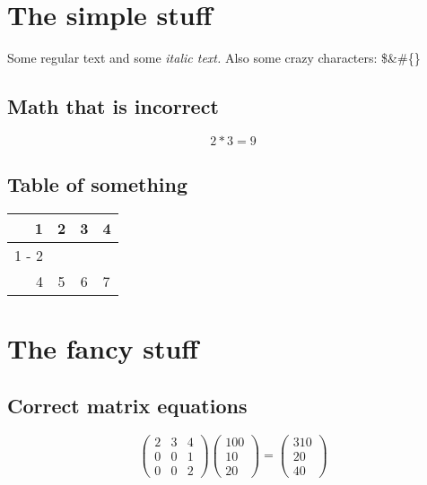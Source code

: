 \documentclass{article}%
\begin{document}
%
\normalsize%
\section{The simple stuff}%
\label{sec:The simple stuff}%
Some regular text and some%
\textit{italic text. }%
\newline%
Also some crazy characters: \$\&\#\{\}%
\subsection{Math that is incorrect}%
\label{subsec:Math that is incorrect}%
\[%
2*3 = 9%
\]

%
\subsection{Table of something}%
\label{subsec:Table of something}%
\begin{tabular}{rc|cl}%
\hline%
1&2&3&4\\%
\cline{1%
-%
2}%
&&&\\%
4&5&6&7\\%
\end{tabular}

%
\section{The fancy stuff}%
\label{sec:The fancy stuff}%
\subsection{Correct matrix equations}%
\label{subsec:Correct matrix equations}%
\[%
\begin{pmatrix}%
2&3&4\\%
0&0&1\\%
0&0&2%
\end{pmatrix} \begin{pmatrix}%
100\\%
10\\%
20%
\end{pmatrix} = \begin{pmatrix}%
310\\%
20\\%
40%
\end{pmatrix}%
\]

%
\end{document}
